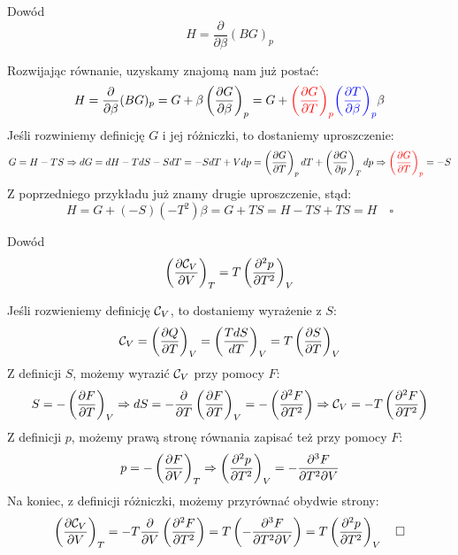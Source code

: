 \documentclass{../notatki}
\begin{document}
\begin{examplebox}
  Dowód
  $$
  H = \frac{\partial}{\partial \beta} (BG)_p
  $$

  \vspace{1em}
  Rozwijając równanie, uzyskamy znajomą nam już postać:
  $$
  H = \frac{\partial}{\partial \beta} (BG)_p = G + \beta \left(\frac{\partial G}{\partial \beta}\right)_p =
  G +
  \textcolor{red}{\left(\frac{\partial G}{\partial T}\right)_p}\textcolor{blue}{\left(\frac{\partial T}{\partial \beta}\right)_p} \beta
  $$
  Jeśli rozwiniemy definicję $G$ i jej różniczki, to dostaniemy uproszczenie:
  $$
  G = H - TS \Rightarrow dG = dH - TdS - SdT = -SdT + Vdp =
  \left(\frac{\partial G}{\partial T}\right)_p dT + \left(\frac{\partial G}{\partial p}\right)_T dp \Rightarrow
  \textcolor{red}{\left(\frac{\partial G}{\partial T}\right)_p} = -S
  $$
  Z poprzedniego przykładu już znamy drugie uproszczenie, stąd:
  $$
  H = G + (-S)(-T^2)\beta = G + TS = H - TS + TS = H \quad \square
  $$
\end{examplebox}

\begin{examplebox}
  Dowód
  $$
  \left(\frac{\partial \mathcal{C}_V}{\partial V}\right)_T = T \left(\frac{\partial^2 p}{\partial T^2}\right)_V
  $$

  \vspace{1em}
  Jeśli rozwieniemy definicję $\mathcal{C}_V$, to dostaniemy wyrażenie z $S$:
  $$
  \mathcal{C}_V = \left(\frac{\partial Q}{\partial T}\right)_V = \left(\frac{TdS}{dT}\right)_V = T\left(\frac{\partial S}{\partial T}\right)_V
  $$
  Z definicji $S$, możemy wyrazić $\mathcal{C}_V$ przy pomocy $F$:
  $$
  S = -\left(\frac{\partial F}{\partial T}\right)_V \Rightarrow dS = - \frac{\partial}{\partial T}
  \left(\frac{\partial F}{\partial T}\right)_V = -\left(\frac{\partial^2 F}{\partial T^2}\right)
  \Rightarrow \mathcal{C}_V = -T\left(\frac{\partial^2 F}{\partial T^2}\right)
  $$
  Z definicji $p$, możemy prawą stronę równania zapisać też przy pomocy $F$:
  $$
  p = - \left(\frac{\partial F}{\partial V}\right)_T \Rightarrow \left(\frac{\partial^2 p}{\partial
  T^2}\right)_V = -\frac{\partial^3 F}{\partial T^2 \partial V}
  $$
  Na koniec, z definicji różniczki, możemy przyrównać obydwie strony:
  $$
  \left(\frac{\partial \mathcal{C}_V}{\partial V}\right)_T = -T\frac{\partial}{\partial V}
  \left(\frac{\partial^2 F}{\partial T^2}\right) = T\left(-\frac{\partial^3
  F}{\partial T^2 \partial V}\right) = T\left(\frac{\partial^2 p}{\partial
  T^2}\right)_V \quad \square
  $$
\end{examplebox}
\end{document}
